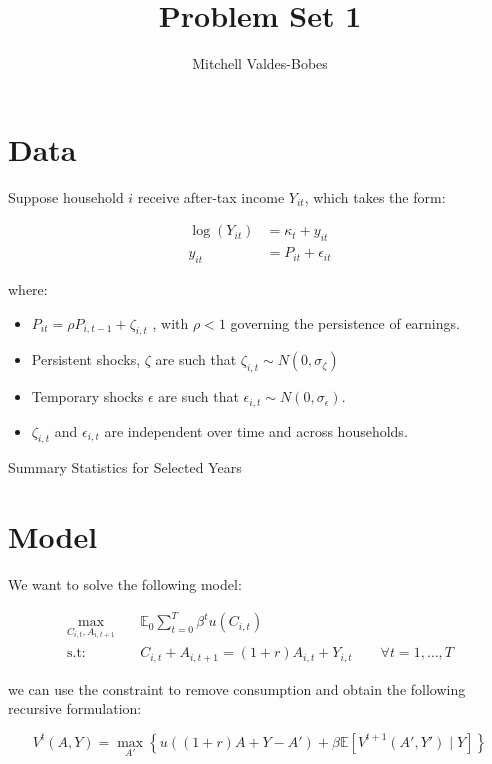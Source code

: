 \documentclass[12pt]{article}
\begin{document}
\title{Problem Set 1 }
\author{Mitchell Valdes-Bobes}
\maketitle



\section{Data}
Suppose household $i$ receive after-tax income $Y_{i t}$, which takes the form:

\begin{align*}
    \log \left(Y_{i t}\right) &=\kappa_{t}+y_{i t} \\
    y_{i t} &=P_{i t}+\epsilon_{i t}
\end{align*}

where:
\begin{itemize}
    \item $P_{i t}=\rho P_{i, t-1}+\zeta_{i, t}$ , with $\rho<1$ governing the persistence of earnings. 
    \item Persistent shocks, $\zeta$ are such that $\zeta_{i, t} \sim N\left(0, \sigma_{\zeta}\right)$
    \item Temporary shocks $\epsilon$ are such that  $\epsilon_{i, t} \sim N\left(0, \sigma_{\epsilon}\right)$. 
    \item $\zeta_{i, t}$ and $\epsilon_{i, t}$ are independent over time and across households.
\end{itemize}

\begin{table}[h!]\caption{Summary Statistics for Selected Years}

\end{table}

\section{Model}
We want to solve the following model:

\begin{align*}\label{810_ps1:seq_problem}
\max_{C_{i,t}, A_{i,t+1}} \quad &\mathbb{E}_0 \sum_{t = 0}^{T}\beta^{t}u(C_{i,t})\\
\text{s.t:} \quad & C_{i,t} + A_{i,t+1} = (1+r)A_{i,t}+Y_{i,t} \qquad \forall t=1,\ldots,T
\end{align*}

we can use the constraint to remove consumption and obtain the following recursive formulation:

\begin{equation}\label{810_ps1:req_problem}
    V^t(A, Y) = \max_{A'}\left\{u\left( (1+r)A+Y - A'\right) + \beta \mathbb{E}\left[ V^{t+1}(A', Y') \mid Y \right] \right\}
\end{equation}



\end{document}
